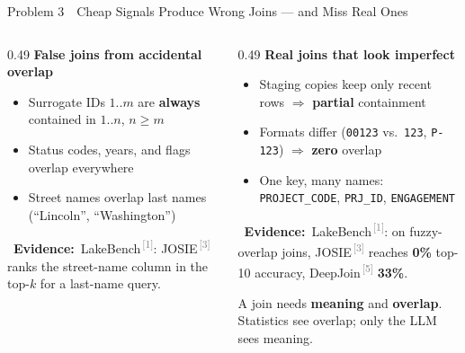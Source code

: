 \documentclass[aspectratio=169]{beamer}
\newcommand{\hred}[1]{\textcolor{tug}{\textbf{#1}}}
\newcommand{\hblue}[1]{\textcolor{tugb}{\textbf{#1}}}
\newcommand{\rf}[1]{\textsuperscript{\textcolor{gray}{\,[#1]}}}
\newcommand{\apptitle}[3]{\textcolor{#1}{#2}~\textcolor{black!30}{\textbar}~#3}
\newcommand{\evidence}[1]{{\scriptsize\textcolor{tugb}{\faSearch~\textbf{Evidence:}}~#1}}
\begin{document}
\begin{frame}{\apptitle{tug}{Problem 3}{Cheap Signals Produce Wrong Joins --- and Miss Real Ones}}
\footnotesize
\vspace{1mm}
\begin{columns}[T]
\begin{column}{0.49\textwidth}
\textbf{\hred{False joins from accidental overlap}}
\begin{itemize}\setlength\itemsep{3pt}
  \item Surrogate IDs $1..m$ are \textbf{always} contained in $1..n$, $n \geq m$
  \item Status codes, years, and flags overlap everywhere
  \item Street names overlap last names (``Lincoln'', ``Washington'')
\end{itemize}
\evidence{LakeBench\rf{1}: JOSIE\rf{3} ranks the street-name column in the top-$k$ for a last-name query.}\par
\vspace{3mm}
\begin{center}
\end{center}
\end{column}
\begin{column}{0.49\textwidth}
\textbf{\hblue{Real joins that look imperfect}}
\begin{itemize}\setlength\itemsep{3pt}
  \item Staging copies keep only recent rows $\Rightarrow$ \textbf{partial} containment
  \item Formats differ (\texttt{00123} vs.\ \texttt{123}, \texttt{P-123}) $\Rightarrow$ \textbf{zero} overlap
  \item One key, many names: \texttt{PROJECT\_CODE}, \texttt{PRJ\_ID}, \texttt{ENGAGEMENT}
\end{itemize}
\evidence{LakeBench\rf{1}: on fuzzy-overlap joins, JOSIE\rf{3} reaches \hred{0\%} top-10 accuracy, DeepJoin\rf{5} \hred{33\%}.}
\vspace{2mm}
\begin{exampleblock}{}
\vspace{0.5mm}
A join needs \textbf{meaning} and \textbf{overlap}. Statistics see overlap; only the LLM sees meaning.
\vspace{0.5mm}
\end{exampleblock}
\end{column}
\end{columns}
\end{frame}
\end{document}
